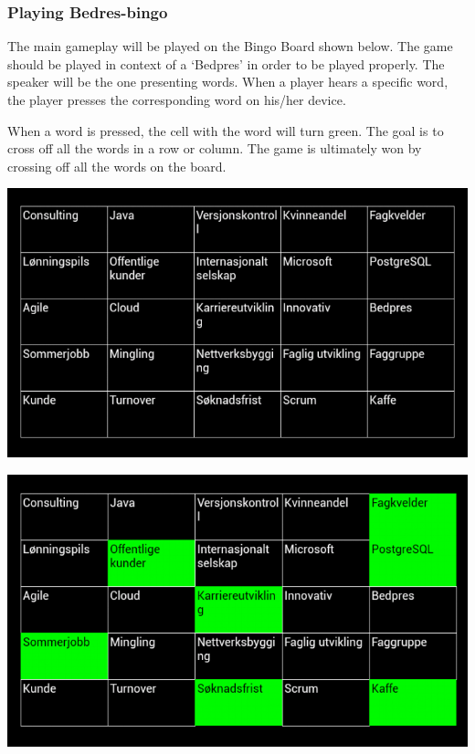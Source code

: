\subsubsection{Playing Bedres-bingo}
The main gameplay will be played on the Bingo Board shown below. The game
should be played in context of a `Bedpres' in order to be played properly.
The speaker will be the one presenting words. When a player hears a specific
word, the player presses the corresponding word on his/her device.

When a word is pressed, the cell with the word will turn green. The goal is to
cross off all the words in a row or column. The game is ultimately won by
crossing off all the words on the board.

\begin{center}
\includegraphics[scale=0.6]{Pikks/maingame}
\end{center}

\begin{center}
\includegraphics[scale=0.6]{Pikks/boardSomeSelected.png}
\end{center}

